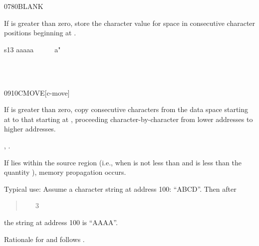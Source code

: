 \begin{worddef}{0780}{BLANK}
\item {}

	If  is greater than zero, store the character value for
	space in  consecutive character positions beginning at
	.

	\begin{testing} \ttfamily
		\word{:} s13  aaaaa~~~~~~a" \word{;}						\tab[4.5]  

							\tab[2.8]   \\
			\tab[1]   \\
									\tab[2.2]  
	\end{testing}
\end{worddef}


\begin{worddef}{0910}{CMOVE}[c-move]
\item {}

	If  is greater than zero, copy  consecutive
	characters from the data space starting at  to
	that starting at , proceeding character-by-character
	from lower addresses to higher addresses.

\see {}, .

	\begin{rationale} %
		If  lies within the source region (i.e., when
		 is not less than  and
		 is less than the quantity 
		 \word[core]{+}), memory propagation occurs.

		Typical use: Assume a character string at address
		100: ``ABCD''. Then after
		\begin{quote}  ~  ~ 3 
		\end{quote}
		the string at address 100 is ``AAAA''.

		Rationale for  and  follows
		.
	\end{rationale}
\end{worddef}


